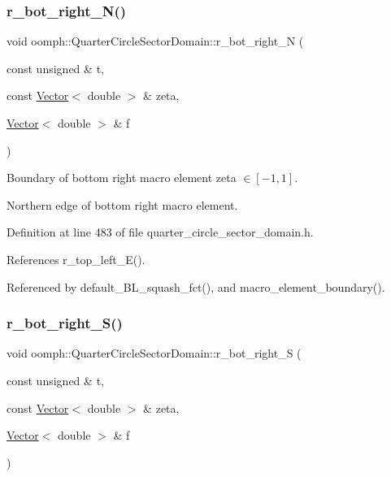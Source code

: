 \subsubsection{\texorpdfstring{r\+\_\+bot\+\_\+right\+\_\+\+N()}{r\_bot\_right\_N()}}
{\footnotesize\ttfamily void oomph\+::\+Quarter\+Circle\+Sector\+Domain\+::r\+\_\+bot\+\_\+right\+\_\+N (\begin{DoxyParamCaption}\item[{const unsigned \&}]{t,  }\item[{const \hyperlink{classoomph_1_1Vector}{Vector}$<$ double $>$ \&}]{zeta,  }\item[{\hyperlink{classoomph_1_1Vector}{Vector}$<$ double $>$ \&}]{f }\end{DoxyParamCaption})\hspace{0.3cm}{\ttfamily [private]}}



Boundary of bottom right macro element zeta $ \in [-1,1] $. 

Northern edge of bottom right macro element. 

Definition at line 483 of file quarter\+\_\+circle\+\_\+sector\+\_\+domain.\+h.



References r\+\_\+top\+\_\+left\+\_\+\+E().



Referenced by default\+\_\+\+B\+L\+\_\+squash\+\_\+fct(), and macro\+\_\+element\+\_\+boundary().

\mbox{\label{classoomph_1_1QuarterCircleSectorDomain_a552f9bfc6fd451669f44ee02c8bb0d38}} 
\subsubsection{\texorpdfstring{r\+\_\+bot\+\_\+right\+\_\+\+S()}{r\_bot\_right\_S()}}
{\footnotesize\ttfamily void oomph\+::\+Quarter\+Circle\+Sector\+Domain\+::r\+\_\+bot\+\_\+right\+\_\+S (\begin{DoxyParamCaption}\item[{const unsigned \&}]{t,  }\item[{const \hyperlink{classoomph_1_1Vector}{Vector}$<$ double $>$ \&}]{zeta,  }\item[{\hyperlink{classoomph_1_1Vector}{Vector}$<$ double $>$ \&}]{f }\end{DoxyParamCaption})\hspace{0.3cm}{\ttfamily [private]}}



